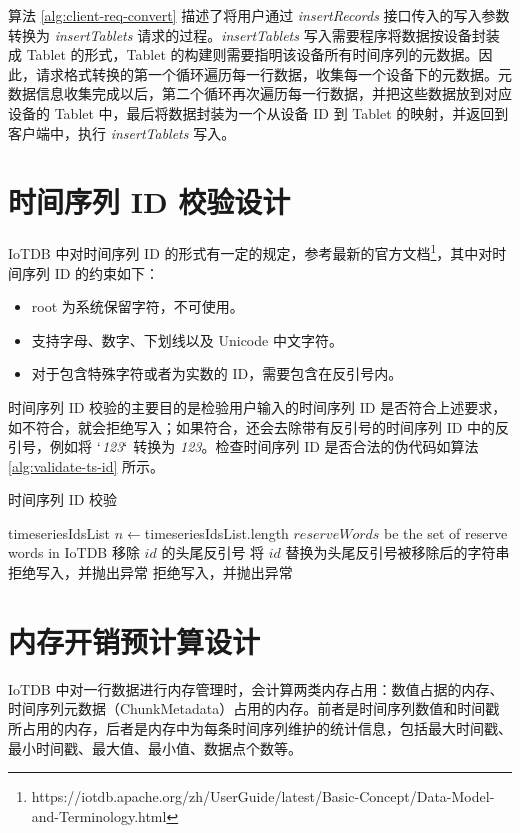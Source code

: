 算法 \ref{alg:client-req-convert} 描述了将用户通过  \emph{insertRecords} 接口传入的写入参数转换为 \emph{insertTablets} 请求的过程。\emph{insertTablets} 写入需要程序将数据按设备封装成 Tablet 的形式，Tablet 的构建则需要指明该设备所有时间序列的元数据。因此，请求格式转换的第一个循环遍历每一行数据，收集每一个设备下的元数据。元数据信息收集完成以后，第二个循环再次遍历每一行数据，并把这些数据放到对应设备的 Tablet 中，最后将数据封装为一个从设备 ID 到 Tablet 的映射，并返回到客户端中，执行 \emph{insertTablets} 写入。

\section{时间序列 ID 校验设计}
IoTDB 中对时间序列 ID 的形式有一定的规定，参考最新的官方文档\footnote{https://iotdb.apache.org/zh/UserGuide/latest/Basic-Concept/Data-Model-and-Terminology.html}，其中对时间序列 ID 的约束如下：
\begin{itemize}
  \item root 为系统保留字符，不可使用。
  \item 支持字母、数字、下划线以及 Unicode 中文字符。
  \item 对于包含特殊字符或者为实数的 ID，需要包含在反引号内。
\end{itemize}
时间序列 ID 校验的主要目的是检验用户输入的时间序列 ID 是否符合上述要求，如不符合，就会拒绝写入；如果符合，还会去除带有反引号的时间序列 ID 中的反引号，例如将 $`$\emph{123}$`$ 转换为 \emph{123}。检查时间序列 ID 是否合法的伪代码如算法 \ref{alg:validate-ts-id} 所示。
\begin{algorithm}
  \caption{时间序列 ID 校验}
  \label{alg:validate-ts-id}
  \small
  \begin{algorithmic}
    \REQUIRE timeseriesIdsList
    \STATE  $n \leftarrow $timeseriesIdsList.length
    \STATE $reserveWords$ be the set of reserve words in IoTDB
      \STATE 移除 $id$ 的头尾反引号
      \STATE 将 $id$ 替换为头尾反引号被移除后的字符串
      \ELSE
      \STATE 拒绝写入，并抛出异常
      \ENDIF
    \STATE 拒绝写入，并抛出异常
    \ENDIF
    \ENDFOR
    \ENDFOR
  \end{algorithmic}
\end{algorithm}

\section{内存开销预计算设计}
IoTDB 中对一行数据进行内存管理时，会计算两类内存占用：数值占据的内存、时间序列元数据（ChunkMetadata）占用的内存。前者是时间序列数值和时间戳所占用的内存，后者是内存中为每条时间序列维护的统计信息，包括最大时间戳、最小时间戳、最大值、最小值、数据点个数等。

